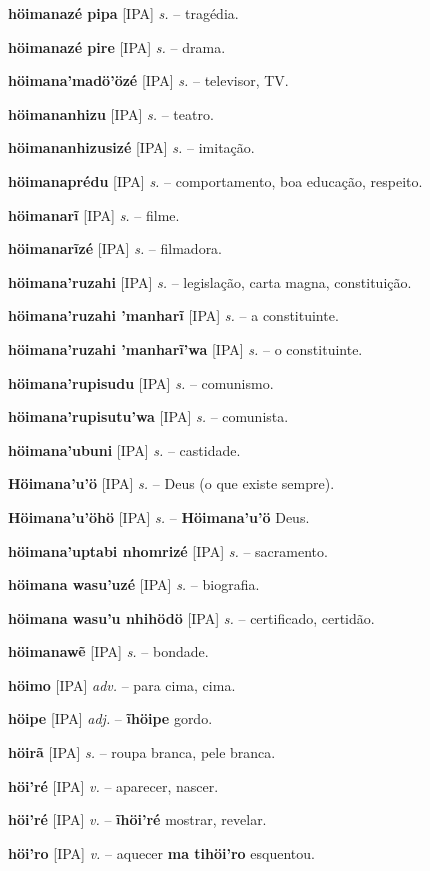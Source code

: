 \textbf{höimanazé pipa} [IPA] \textit{s.} -- tragédia.

\textbf{höimanazé pire} [IPA] \textit{s.} -- drama.

\textbf{höimana'madö'özé} [IPA] \textit{s.} -- televisor, TV.

\textbf{höimananhizu} [IPA] \textit{s.} -- teatro.

\textbf{höimananhizusizé} [IPA] \textit{s.} -- imitação.

\textbf{höimanaprédu} [IPA] \textit{s.} -- comportamento, boa educação, respeito.

\textbf{höimanarĩ} [IPA] \textit{s.} -- filme.

\textbf{höimanarĩzé} [IPA] \textit{s.} -- filmadora.

\textbf{höimana'ruzahi} [IPA] \textit{s.} -- legislação, carta magna, constituição.

\textbf{höimana'ruzahi 'manharĩ} [IPA] \textit{s.} -- a constituinte.

\textbf{höimana'ruzahi 'manharĩ'wa} [IPA] \textit{s.} -- o constituinte.

\textbf{höimana'rupisudu} [IPA] \textit{s.} -- comunismo.

\textbf{höimana'rupisutu'wa} [IPA] \textit{s.} -- comunista.

\textbf{höimana'ubuni} [IPA] \textit{s.} -- castidade.

\textbf{Höimana'u'ö} [IPA] \textit{s.} -- Deus (o que existe sempre).

\textbf{Höimana'u'öhö} [IPA] \textit{s.} -- \textbf{Höimana'u'ö} Deus.

\textbf{höimana'uptabi nhomrizé} [IPA] \textit{s.} -- sacramento.

\textbf{höimana wasu'uzé} [IPA] \textit{s.} -- biografia.

\textbf{höimana wasu'u nhihödö} [IPA] \textit{s.} -- certificado, certidão.

\textbf{höimanawẽ} [IPA] \textit{s.} -- bondade.

\textbf{höimo} [IPA] \textit{adv.} -- para cima, cima.

\textbf{höipe} [IPA] \textit{adj.} -- \textbf{ĩhöipe} gordo.

\textbf{höirã} [IPA] \textit{s.} -- roupa branca, pele branca.

\textbf{höi'ré} [IPA] \textit{v.} -- aparecer, nascer.

\textbf{höi'ré} [IPA] \textit{v.} -- \textbf{ĩhöi'ré} mostrar, revelar.

\textbf{höi'ro} [IPA] \textit{v.} -- aquecer  \textbf{ma tihöi'ro} esquentou.

